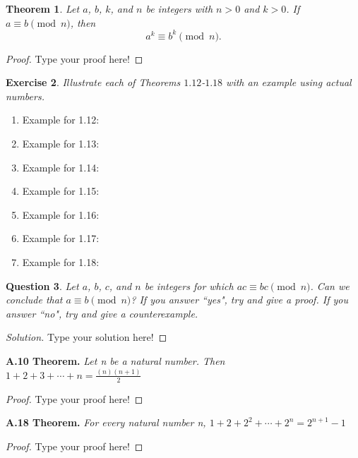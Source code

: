 \documentclass[12pt,leqno]{article}
\numberwithin{equation}{section}
\newtheorem{thm}{Theorem}[section]
\newtheorem{exer}[thm]{Exercise}
\newtheorem{ques}[thm]{Question}
\theoremstyle{definition}
\begin{document}
\begin{thm}
Let $a$, $b$, $k$, and $n$ be integers with $n
> 0$ and $k > 0$.  If $a \equiv b \pmod{n}$,
then \[a^k \equiv b^k \pmod{n}.\]
\end{thm}

\begin{proof}[Proof]
Type your proof here!
\end{proof}


\begin{exer}
Illustrate each of Theorems $1.12$-$1.18$ with
an example using actual numbers.
\end{exer}

\begin{enumerate}

\item Example for 1.12:
\item Example for 1.13:
\item Example for 1.14:
\item Example for 1.15:
\item Example for 1.16:
\item Example for 1.17:
\item Example for 1.18:

\end{enumerate}

\begin{ques}
Let $a$, $b$, $c$, and $n$ be integers for which $ac \equiv bc
\pmod{n}$. Can we conclude that $a \equiv b \pmod{n}$? If you answer
``yes", try and give a proof. If you answer ``no", try and give a
counterexample.
\end{ques}

\begin{proof}[Solution]
Type your solution here!
\end{proof}




\noindent \textbf{A.10 Theorem.} \emph{Let n be a natural number. Then $1+2+3+\cdots + n=\frac{(n)(n+1)}{2}$}

\begin{proof}[Proof]
Type your proof here!
\end{proof}


\noindent \textbf{A.18 Theorem.} \emph{For every natural number n,  $1+2+2^2+\cdots + 2^n=2^{n+1}-1$}

\begin{proof}[Proof]
Type your proof here!
\end{proof}
\end{document}

